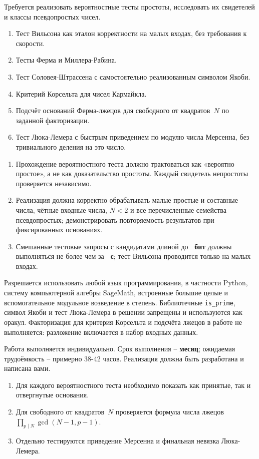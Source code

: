 \documentclass{ca-capstone}
\begin{document}


\goal
Требуется реализовать вероятностные тесты простоты, исследовать их свидетелей и
классы псевдопростых чисел.

\functionality
\begin{enumerate}
  \item Тест Вильсона как эталон корректности на малых входах, без требования к скорости.
  \item Тесты Ферма и Миллера-Рабина.
  \item Тест Соловея-Штрассена с самостоятельно реализованным символом Якоби.
  \item Критерий Корсельта для чисел Кармайкла.
  \item Подсчёт оснований Ферма-лжецов для свободного от квадратов~$N$ по заданной
    факторизации.
  \item Тест Люка-Лемера с быстрым приведением по модулю числа Мерсенна, без тривиального
    деления на это число.
\end{enumerate}

\requirements
\begin{enumerate}
  \item Прохождение вероятностного теста должно трактоваться как «вероятно простое», а не как
    доказательство простоты. Каждый свидетель непростоты проверяется независимо.
  \item Реализация должна корректно обрабатывать малые простые и составные числа, чётные входные числа, $N<2$ и все перечисленные семейства псевдопростых; 
    демонстрировать повторяемость результатов при фиксированных основаниях.
  \item Смешанные тестовые запросы с кандидатами длиной до \textbf{\ReqBitsMax~бит} должны
    выполняться не более чем за \textbf{\ReqSeconds~с}; тест Вильсона проводится только на
    малых входах.
\end{enumerate}

\details
Разрешается использовать любой язык программирования, в частности Python, систему 
компьютерной алгебры SageMath, встроенные большие целые и вспомогательное модульное возведение
в степень. Библиотечные \texttt{is\_prime}, символ Якоби и тест Люка-Лемера в решении
запрещены и используются как оракул. Факторизация для критерия Корсельта и подсчёта лжецов
в работе не выполняется: разложение включается в набор входных данных.

\schedule
Работа выполняется индивидуально. Срок выполнения -- \textbf{месяц}; ожидаемая трудоёмкость
-- примерно 38-42 часов. Реализация должна быть разработана и написана вами.

\remarks
\begin{enumerate}
  \item Для каждого вероятностного теста необходимо показать как принятые, так и отвергнутые основания.
  \item Для свободного от квадратов~$N$ проверяется формула числа лжецов
    $\prod_{p\mid N}\gcd(N-1,p-1)$.
  \item Отдельно тестируются приведение Мерсенна и финальная невязка Люка-Лемера.
\end{enumerate}

\end{document}
